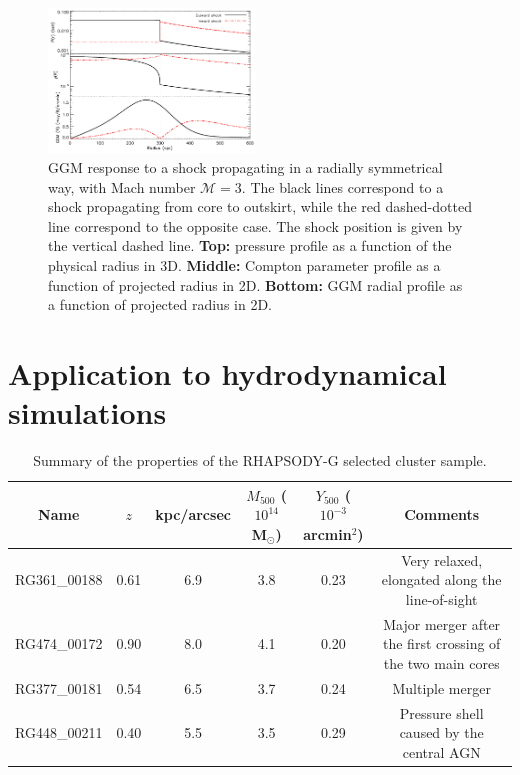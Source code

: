 \documentclass[twocolumn,traditabstract]{aa}
\begin{document}
\begin{figure}[h]
\centering
\includegraphics[trim=0cm 0cm 0cm 0cm, clip=true, width=0.49\textwidth]{Figure/Profiles_shock_15_15_45.pdf}
\caption{\footnotesize{GGM response to a shock propagating in a radially symmetrical way, with Mach number $\mathcal{M} = 3$. The black lines correspond to a shock propagating from core to outskirt, while the red dashed-dotted line correspond to the opposite case. The shock position is given by the vertical dashed line.
{\bf Top:} pressure profile as a function of the physical radius in 3D. 
{\bf Middle:} Compton parameter profile as a function of projected radius in 2D. 
{\bf Bottom:} GGM radial profile as a function of projected radius in 2D.}}
\label{fig:test_filter_shock}
\end{figure}



\section{Application to hydrodynamical simulations}\label{sec:Application_to_hydrodynamical_simulations}
\begin{table}[]
\caption{\footnotesize{Summary of the properties of the RHAPSODY-G selected cluster sample.}}
\begin{center}
\begin{tabular}{c|c|c|c|c|c}
\hline
\hline
Name & $z$ & kpc/arcsec & $M_{500}$ ($10^{14}$ M$_{\odot}$)& $Y_{500}$ ($10^{-3}$arcmin$^2$) & Comments \\
\hline
RG361\_00188 & 0.61 & 6.9 & 3.8 & 0.23 & Very relaxed, elongated along the line-of-sight \\ 
RG474\_00172 & 0.90 & 8.0 & 4.1 & 0.20 & Major merger after the first crossing of the two main cores \\ 
RG377\_00181 & 0.54 & 6.5 & 3.7 & 0.24 & Multiple merger \\
RG448\_00211 & 0.40 & 5.5 & 3.5 & 0.29 & Pressure shell caused by the central AGN \\ 
\hline
\end{tabular}
\end{center}
\label{tab:rhapsody_summary}
\end{table}
\end{document}
